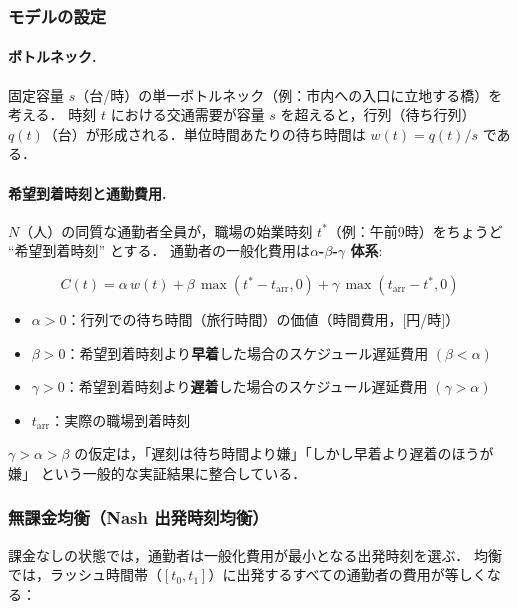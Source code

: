 \subsubsection*{モデルの設定}

\paragraph{ボトルネック.}
固定容量 $s$（台/時）の単一ボトルネック（例：市内への入口に立地する橋）を考える．
時刻 $t$ における交通需要が容量 $s$ を超えると，行列（待ち行列）
$q(t)$（台）が形成される．単位時間あたりの待ち時間は $w(t) = q(t)/s$ である．

\paragraph{希望到着時刻と通勤費用.}
$N$（人）の同質な通勤者全員が，職場の始業時刻 $t^*$（例：午前9時）をちょうど ``希望到着時刻'' とする．
通勤者の一般化費用は\textbf{$\alpha$-$\beta$-$\gamma$ 体系}\cite{Small1982,ArnottdePalmaLindsey1990}:

\begin{equation}
  C(t)
  = \alpha\, w(t)
  + \beta\, \max(t^* - t_{\text{arr}}, 0)
  + \gamma\, \max(t_{\text{arr}} - t^*, 0)
  \label{eq:abc-cost}
\end{equation}

\begin{itemize}
  \item $\alpha > 0$：行列での待ち時間（旅行時間）の価値（時間費用，$[$円/時$]$）
  \item $\beta > 0$：希望到着時刻より\textbf{早着}した場合のスケジュール遅延費用 $(\beta < \alpha)$
  \item $\gamma > 0$：希望到着時刻より\textbf{遅着}した場合のスケジュール遅延費用 $(\gamma > \alpha)$
  \item $t_{\text{arr}}$：実際の職場到着時刻
\end{itemize}

$\gamma > \alpha > \beta$ の仮定は，「遅刻は待ち時間より嫌」「しかし早着より遅着のほうが嫌」
という一般的な実証結果に整合している．

\subsubsection*{無課金均衡（Nash 出発時刻均衡）}

課金なしの状態では，通勤者は一般化費用が最小となる出発時刻を選ぶ．
均衡では，ラッシュ時間帯（$[t_0, t_1]$）に出発するすべての通勤者の費用が等しくなる：

